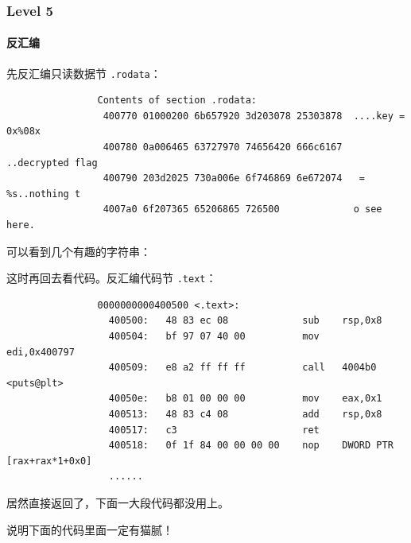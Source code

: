 \documentclass{ctexbeamer}
\begin{document}
    \begin{frame}[fragile]
        \frametitle{Level 5}
        \framesubtitle{反汇编}
    
        先反汇编只读数据节 \texttt{.rodata}：

        {
            \small
            \begin{verbatim}
                Contents of section .rodata:
                 400770 01000200 6b657920 3d203078 25303878  ....key = 0x%08x
                 400780 0a006465 63727970 74656420 666c6167  ..decrypted flag
                 400790 203d2025 730a006e 6f746869 6e672074   = %s..nothing t
                 4007a0 6f207365 65206865 726500             o see here.     
            \end{verbatim}
        }


        \pause
        可以看到几个有趣的字符串：\pause

    
    \end{frame}

    \begin{frame}[fragile]
    
        这时再回去看代码。反汇编代码节 \texttt{.text}：

        {
            \small
            \begin{verbatim}
                0000000000400500 <.text>:
                  400500:	48 83 ec 08          	sub    rsp,0x8
                  400504:	bf 97 07 40 00       	mov    edi,0x400797
                  400509:	e8 a2 ff ff ff       	call   4004b0 <puts@plt>
                  40050e:	b8 01 00 00 00       	mov    eax,0x1
                  400513:	48 83 c4 08          	add    rsp,0x8
                  400517:	c3                   	ret
                  400518:	0f 1f 84 00 00 00 00 	nop    DWORD PTR [rax+rax*1+0x0]
                  ......
            \end{verbatim}
        }

        居然直接返回了，下面一大段代码都没用上。\pause

        说明下面的代码里面一定有猫腻！
    
    \end{frame}
\end{document}
